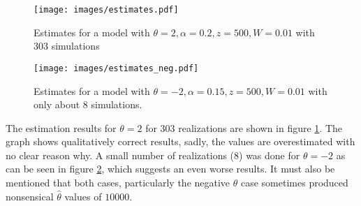 \documentclass[12pt,a4paper]{report}
\begin{document}
\begin{figure}[h]
    \centering
    \texttt{[image: images/estimates.pdf]}
    \caption{Estimates for a model with $\theta=2, \alpha = 0.2, z = 500, W = 0.01$ with $303$ simulations}
    \label{fig:estimates}
\end{figure}

\begin{figure}[h]
    \centering
    \texttt{[image: images/estimates\_neg.pdf]}
    \caption{Estimates for a model with $\theta=-2, \alpha = 0.15, z = 500, W = 0.01$ with only about $8$ simulations.}
    \label{fig:estimates_neg}
\end{figure}
The estimation results for $\theta=2$ for $303$ realizations are shown in figure \ref{fig:estimates}. The graph shows qualitatively correct results, sadly, the values are overestimated with no clear reason why. A small number of realizations ($8$) was done for $\theta=-2$ as can be seen in figure \ref{fig:estimates_neg}, which suggests an even worse results. It must also be mentioned that both cases, particularly the negative $\theta$ case sometimes produced nonsensical $\hat\theta$ values of $10000$. \newline













\listoftodos
\end{document}
